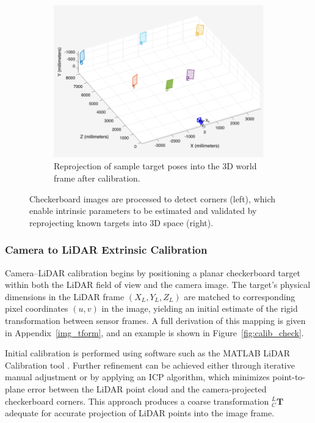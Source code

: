 \documentclass{erauthesis}
\begin{document}
\begin{figure}[htbp]
{\begin{subfigure}[t]{0.625\textwidth}
        \includegraphics[width=\textwidth]{Images/cam_calib_2.png}
        \caption{Reprojection of sample target poses into the 3D world frame after calibration.}
        \label{fig:cam_calib_2}
    \end{subfigure}%
}
\caption{Checkerboard images are processed to detect corners (left), which enable intrinsic parameters to be estimated and validated by reprojecting known targets into 3D space (right).}
\label{fig:cam_calib}
\end{figure}


\subsubsection{Camera to LiDAR Extrinsic Calibration} \label{camLidar_calib}

Camera–LiDAR calibration begins by positioning a planar checkerboard target within both the LiDAR field of view and the camera image.  
The target’s physical dimensions in the LiDAR frame $(X_L, Y_L, Z_L)$ are matched to corresponding pixel coordinates $(u,v)$ in the image, yielding an initial estimate of the rigid transformation between sensor frames.  
A full derivation of this mapping is given in Appendix~\ref{img_tform}, and an example is shown in Figure~\ref{fig:calib_check}.

Initial calibration is performed using software such as the MATLAB LiDAR Calibration tool \cite{matlab_calibration}.  
Further refinement can be achieved either through iterative manual adjustment or by applying an \ac{ICP} algorithm, which minimizes point-to-plane error between the LiDAR point cloud and the camera-projected checkerboard corners.  
This approach produces a coarse transformation $_{C}^{L}\mathbf{T}$ adequate for accurate projection of LiDAR points into the image frame.
\end{document}

